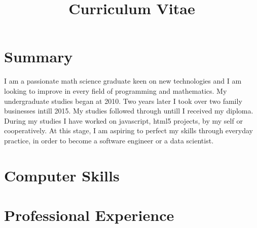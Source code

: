 \documentclass[11pt,a4paper,sans]{moderncv}
\title{Curriculum Vitae}
\begin{document}
\makecvtitle


\section{Summary}
\opening{ }
I am a passionate math science graduate keen on new technologies 
and I am looking to improve in every field of programming and mathematics. 
My undergraduate studies began at 2010. Two years later 
I took over two family businesses intill 2015. My studies followed 
through untill I received my diploma. During my studies I have 
worked on javascript, html5 projects, by my self 
or cooperatively. At this stage, 
I am aspiring to perfect my skills through everyday practice, 
in order to become a software engineer or a data scientist. 


\section{Computer Skills}
\section{Professional Experience}
\end{document}
